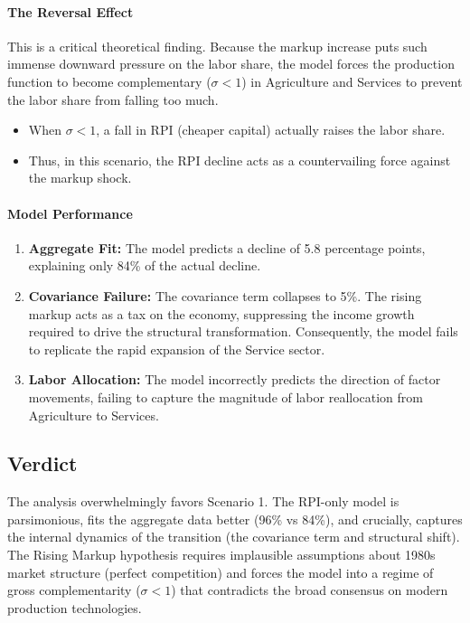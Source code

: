 \documentclass[12pt]{article}
\begin{document}
\paragraph{The Reversal Effect}
This is a critical theoretical finding. Because the markup increase puts such immense downward pressure on the labor share, the model forces the production function to become complementary ($\sigma < 1$) in Agriculture and Services to prevent the labor share from falling too much.
\begin{itemize}[leftmargin=*,itemsep=4pt]
\item When $\sigma < 1$, a fall in RPI (cheaper capital) actually raises the labor share.
\item Thus, in this scenario, the RPI decline acts as a countervailing force against the markup shock.
\end{itemize}

\paragraph{Model Performance}
\begin{enumerate}[leftmargin=*,itemsep=4pt]
\item \textbf{Aggregate Fit:} The model predicts a decline of 5.8 percentage points, explaining only 84\% of the actual decline.
\item \textbf{Covariance Failure:} The covariance term collapses to 5\%. The rising markup acts as a tax on the economy, suppressing the income growth required to drive the structural transformation. Consequently, the model fails to replicate the rapid expansion of the Service sector.
\item \textbf{Labor Allocation:} The model incorrectly predicts the direction of factor movements, failing to capture the magnitude of labor reallocation from Agriculture to Services.
\end{enumerate}

\subsection{Verdict}
The analysis overwhelmingly favors Scenario 1. The RPI-only model is parsimonious, fits the aggregate data better (96\% vs 84\%), and crucially, captures the internal dynamics of the transition (the covariance term and structural shift). The Rising Markup hypothesis requires implausible assumptions about 1980s market structure (perfect competition) and forces the model into a regime of gross complementarity ($\sigma < 1$) that contradicts the broad consensus on modern production technologies.
\end{document}
